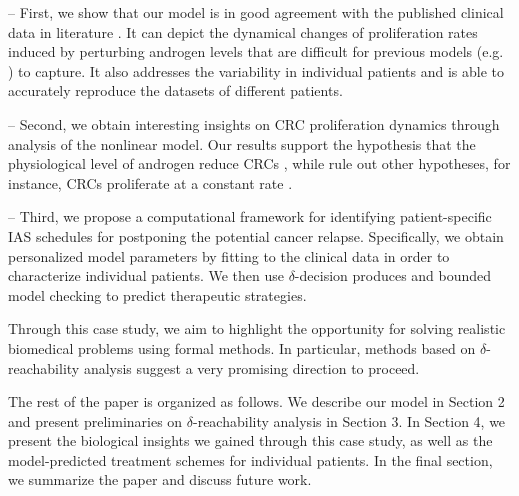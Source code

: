 -- First, we show that our model is in good agreement with the published clinical data in literature \cite{ bruchovsky06,bruchovsky07}. It can depict the dynamical changes of proliferation rates induced by perturbing androgen levels that are difficult for previous models (e.g. \cite{ideta08}) to capture. It also addresses the variability in individual patients and is able to accurately reproduce the datasets of different patients.  

-- Second, we obtain interesting insights on CRC proliferation dynamics through analysis of the nonlinear model. Our results support the hypothesis that the physiological level of androgen reduce CRCs \cite{ideta08}, while rule out other hypotheses, for instance, CRCs proliferate at a constant rate \cite{portz12}. 

-- Third, we propose a computational framework for identifying patient-specific IAS schedules for postponing the potential cancer relapse. Specifically, we obtain personalized model parameters by fitting to the clinical data in order to characterize individual patients. We then use $\delta$-decision produces and bounded model checking to predict therapeutic strategies. 

Through this case study, we aim to highlight the opportunity for solving realistic biomedical problems using formal methods. In particular, methods based on $\delta$-reachability analysis suggest a very promising direction to proceed.  


The rest of the paper is organized as follows. We describe our model in Section 2 and present preliminaries on $\delta$-reachability analysis in Section 3. In Section 4, we present the biological insights we gained through this case study, as well as the model-predicted treatment schemes for individual patients. In the final section, we summarize the paper and discuss future work.

